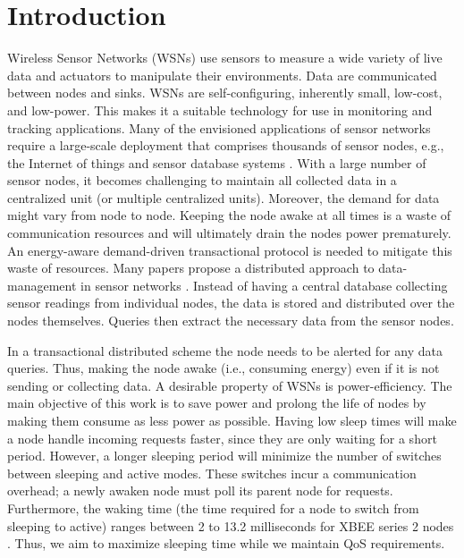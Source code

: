 \section{Introduction}\label{sec:Intro}

Wireless Sensor Networks (WSNs) use sensors to measure a wide variety of live data and actuators to manipulate their environments. Data are communicated between nodes and sinks. WSNs are self-configuring, inherently small, low-cost, and low-power. This makes it a suitable technology for use in monitoring and tracking applications. Many of the envisioned applications of sensor networks require a large-scale deployment that comprises thousands of sensor nodes, e.g., the Internet of things \cite{22} and sensor database systems \cite{2}. With a large number of sensor nodes, it becomes challenging to maintain all collected data in a centralized unit (or multiple centralized units). Moreover, the demand for data might vary from node to node. Keeping the node awake at all times is a waste of communication resources and will ultimately drain the nodes power prematurely. An energy-aware demand-driven transactional protocol is needed to mitigate this waste of resources. Many papers propose a distributed approach to data-management in sensor networks \cite{2,4.11,23}. Instead of having a central database collecting sensor readings from individual nodes, the data is stored and distributed over the nodes themselves. Queries then extract the necessary data from the sensor nodes. 

In a transactional distributed scheme the node needs to be alerted for any data queries. Thus, making the node awake (i.e., consuming energy) even if it is not sending or collecting data. A desirable property of WSNs is power-efficiency. The main objective of this work is to save power and prolong the life of nodes by making them consume as less power as possible. Having low sleep times will make a node handle incoming requests faster, since they are only waiting for a short period. However, a longer sleeping period will minimize the number of switches between sleeping and active modes. These switches incur a communication overhead; a newly awaken node must poll its parent node for requests. Furthermore, the waking time (the time required for a node to switch from sleeping to active) ranges between 2 to 13.2 milliseconds for XBEE series 2 nodes \cite{19}. Thus, we aim to maximize sleeping time while we maintain QoS requirements.

